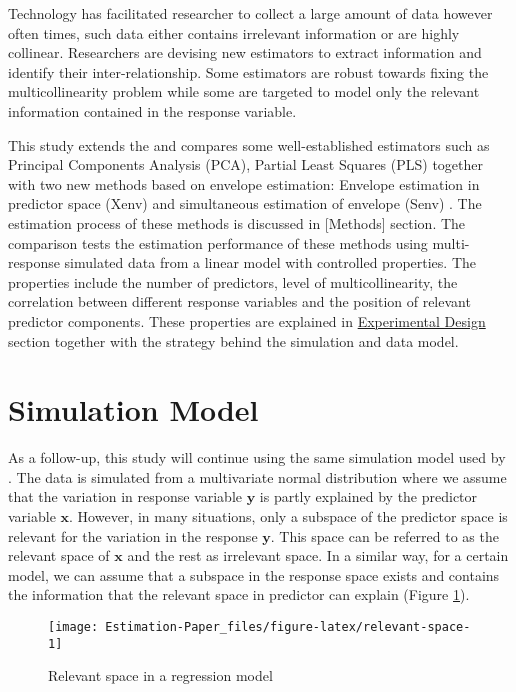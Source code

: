 \documentclass[12pt,3p,authoryear]{elsarticle}
\begin{document}
Technology has facilitated researcher to collect a large amount of data however often times, such data either contains irrelevant information or are highly collinear. Researchers are devising new estimators to extract information and identify their inter-relationship. Some estimators are robust towards fixing the multicollinearity problem while some are targeted to model only the relevant information contained in the response variable.

This study extends the \citep{rimal2019pred} and compares some well-established estimators such as Principal Components Analysis (PCA), Partial Least Squares (PLS) together with two new methods based on envelope estimation: Envelope estimation in predictor space (Xenv) \citep{cook2010envelope} and simultaneous estimation of envelope (Senv) \citep{cook2015simultaneous}. The estimation process of these methods is discussed in {[}Methods{]} section. The comparison tests the estimation performance of these methods using multi-response simulated data from a linear model with controlled properties. The properties include the number of predictors, level of multicollinearity, the correlation between different response variables and the position of relevant predictor components. These properties are explained in \protect\hyperlink{experimental-design}{Experimental Design} section together with the strategy behind the simulation and data model.

\hypertarget{simulation-model}{%
\section{Simulation Model}\label{simulation-model}}

As a follow-up, this study will continue using the same simulation model used by \citet{rimal2019pred}. The data is simulated from a multivariate normal distribution where we assume that the variation in response variable \(\mathbf{y}\) is partly explained by the predictor variable \(\mathbf{x}\). However, in many situations, only a subspace of the predictor space is relevant for the variation in the response \(\mathbf{y}\). This space can be referred to as the relevant space of \(\mathbf{x}\) and the rest as irrelevant space. In a similar way, for a certain model, we can assume that a subspace in the response space exists and contains the information that the relevant space in predictor can explain (Figure \ref{fig:relevant-space}).

\begin{figure}

{\centering \texttt{[image: Estimation-Paper\_files/figure-latex/relevant-space-1]} 

}

\caption{Relevant space in a regression model}\label{fig:relevant-space}
\end{figure}
\end{document}
